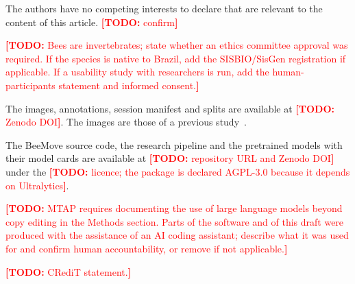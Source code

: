 \documentclass[pdflatex,sn-basic,Numbered]{sn-jnl}
\newcommand{\todo}[1]{\textcolor{red}{\textbf{[TODO:} #1\textbf{]}}}
\newcommand{\beemove}{BeeMove}
\theoremstyle{thmstyleone}%
\begin{document}
The authors have no competing interests to declare that are relevant to the content of this article. \todo{confirm}

\todo{Bees are invertebrates; state whether an ethics committee approval was required. If the species is native to Brazil, add the SISBIO/SisGen registration if applicable. If a usability study with researchers is run, add the human-participants statement and informed consent.}

The images, annotations, session manifest and splits are available at \todo{Zenodo DOI}. The images are those of a previous study~\cite{lima2025analyzing}.

The \beemove{} source code, the research pipeline and the pretrained models with their model cards are available at \todo{repository URL and Zenodo DOI} under the \todo{licence; the package is declared AGPL-3.0 because it depends on Ultralytics}.

\todo{MTAP requires documenting the use of large language models beyond copy editing in the Methods section. Parts of the software and of this draft were produced with the assistance of an AI coding assistant; describe what it was used for and confirm human accountability, or remove if not applicable.}

\todo{CRediT statement.}


\end{document}
